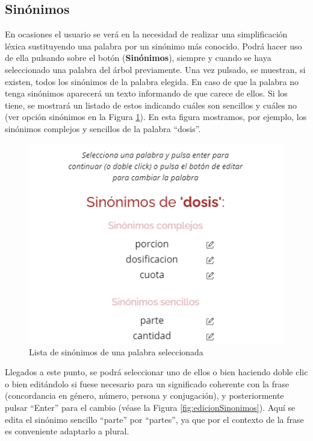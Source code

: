 \subsection{Sinónimos}
En ocasiones el usuario se verá en la necesidad de realizar una simplificación léxica sustituyendo una palabra por un sinónimo más conocido. Podrá hacer uso de ella pulsando sobre el botón (\textbf{Sinónimos}), siempre y cuando se haya seleccionado una palabra del árbol previamente. Una vez pulsado, se muestran, si existen, todos los sinónimos de la palabra elegida. En caso de que la palabra no tenga sinónimos aparecerá un texto informando de que carece de ellos. Si los tiene, se mostrará un listado de estos indicando cuáles son sencillos y cuáles no (ver opción sinónimos en la Figura \ref{fig:listaSinonimos}). En esta figura mostramos, por ejemplo, los sinónimos complejos y sencillos de la palabra ``dosis''.

	 \begin{figure}[h!]
	\centering
	
	
	\includegraphics[scale=1.0]{Imagenes/Figuras/SinonimoPersona}
	
	
	\caption{Lista de sinónimos de una palabra seleccionada}
	\label{fig:listaSinonimos}
\end{figure}

 Llegados a este punto, se podrá seleccionar uno de ellos o bien haciendo doble clic o bien editándolo si fuese necesario para un significado coherente con la frase (concordancia en género, número, persona y conjugación), y posteriormente pulsar ``Enter'' para el cambio (véase la Figura \ref{fig:edicionSinonimos}). Aquí se edita el sinónimo sencillo ``parte'' por ``partes'', ya que por el contexto de la frase es conveniente adaptarlo a plural.


